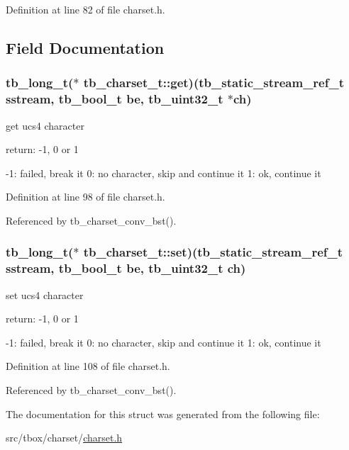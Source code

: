Definition at line 82 of file charset.\-h.



\subsection{Field Documentation}
\hypertarget{structtb__charset__t_a992d5d1d054ef4900b293d96c87a09e9}{
\subsubsection[{get}]{\setlength{\rightskip}{0pt plus 5cm}tb\-\_\-long\-\_\-t($\ast$ tb\-\_\-charset\-\_\-t\-::get)({\bf tb\-\_\-static\-\_\-stream\-\_\-ref\-\_\-t} sstream, tb\-\_\-bool\-\_\-t be, tb\-\_\-uint32\-\_\-t $\ast$ch)}}\label{structtb__charset__t_a992d5d1d054ef4900b293d96c87a09e9}
get ucs4 character

return\-: -\/1, 0 or 1

-\/1\-: failed, break it 0\-: no character, skip and continue it 1\-: ok, continue it 

Definition at line 98 of file charset.\-h.



Referenced by tb\-\_\-charset\-\_\-conv\-\_\-bst().

\hypertarget{structtb__charset__t_a93d799d2d1bb181e7cd8884b8ef7e5b0}{
\subsubsection[{set}]{\setlength{\rightskip}{0pt plus 5cm}tb\-\_\-long\-\_\-t($\ast$ tb\-\_\-charset\-\_\-t\-::set)({\bf tb\-\_\-static\-\_\-stream\-\_\-ref\-\_\-t} sstream, tb\-\_\-bool\-\_\-t be, tb\-\_\-uint32\-\_\-t ch)}}\label{structtb__charset__t_a93d799d2d1bb181e7cd8884b8ef7e5b0}
set ucs4 character

return\-: -\/1, 0 or 1

-\/1\-: failed, break it 0\-: no character, skip and continue it 1\-: ok, continue it 

Definition at line 108 of file charset.\-h.



Referenced by tb\-\_\-charset\-\_\-conv\-\_\-bst().



The documentation for this struct was generated from the following file\-:\begin{DoxyCompactItemize}
\item 
src/tbox/charset/\hyperlink{charset_8h}{charset.\-h}\end{DoxyCompactItemize}
